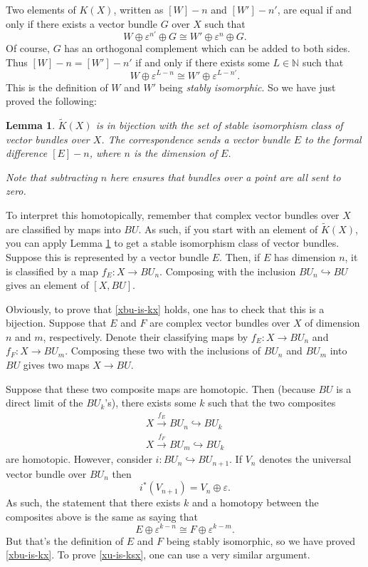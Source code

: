 \documentclass[a4paper,10pt]{article}
\theoremstyle{plain}%
\newtheorem{lem}[thm]{Lemma}
\theoremstyle{definition}
\theoremstyle{remark}
\newcommand{\NN}{\mathbb{N}}
\renewcommand{\epsilon}{\varepsilon}
\newcommand{\eps}{\epsilon}
\newcommand{\into}{\hookrightarrow}
\newcommand{\xto}[1]{\xrightarrow{#1}}
\begin{document}
Two elements of $K(X)$, written as $[W]-n$ and $[W']-n'$, are equal if
and only if there exists a vector bundle $G$ over $X$ such that
\begin{equation*}
  W \oplus \eps^{n'} \oplus G \cong W' \oplus \eps^n \oplus G.
\end{equation*}
Of course, $G$ has an orthogonal complement which can be added to both
sides. Thus $[W]-n = [W']-n'$ if and only if there exists some $L\in
\NN$ such that
\begin{equation*}
  W \oplus \epsilon^{L-n} \cong W' \oplus \epsilon^{L-n'}.
\end{equation*}
This is the definition of $W$ and $W'$ being \emph{stably
  isomorphic}. So we have just proved the following:
\begin{lem}\label{kx-stableisos}
  $\tilde{K}(X)$ is in bijection with the set of stable isomorphism
  class of vector bundles over $X$. The correspondence sends a vector
  bundle $E$ to the formal difference $[E]-n$, where $n$ is the
  dimension of $E$.

  Note that subtracting $n$ here ensures that bundles over a point are
  all sent to zero.
\end{lem}

To interpret this homotopically, remember that complex vector bundles
over $X$ are classified by maps into $BU$. As such, if you start with
an element of $\tilde{K}(X)$, you can apply Lemma \ref{kx-stableisos}
to get a stable isomorphism class of vector bundles. Suppose this is
represented by a vector bundle $E$. Then, if $E$ has dimension $n$, it
is classified by a map $f_E: X \to BU_n$. Composing with the inclusion
$BU_n \into BU$ gives an element of $[X, BU]$.

Obviously, to prove that \eqref{xbu-is-kx} holds, one has to check
that this is a bijection. Suppose that $E$ and $F$ are complex vector
bundles over $X$ of dimension $n$ and $m$, respectively. Denote their
classifying maps by $f_E: X \to BU_n$ and $f_F: X \to BU_m$. Composing
these two with the inclusions of $BU_n$ and $BU_m$ into $BU$ gives two
maps $X\to BU$.

Suppose that these two composite maps are homotopic. Then (because
$BU$ is a direct limit of the $BU_k$'s), there exists some $k$ such that
the two composites
\begin{gather*}
  X \xto{f_E} BU_n \into BU_k\\
  X \xto{f_F} BU_m \into BU_k
\end{gather*}
are homotopic. However, consider $i: BU_n \into BU_{n+1}$. If $V_n$
denotes the universal vector bundle over $BU_n$ then
\begin{equation*}
  i^*(V_{n+1}) = V_n \oplus \eps.
\end{equation*}
As such, the statement that there exists $k$ and a homotopy between
the composites above is the same as saying that
\begin{equation*}
  E \oplus \eps^{k-n} \cong F\oplus \eps^{k-m}.
\end{equation*}
But that's the definition of $E$ and $F$ being stably isomorphic, so
we have proved \eqref{xbu-is-kx}. To prove \eqref{xu-is-ksx}, one can
use a very similar argument.
\end{document}
